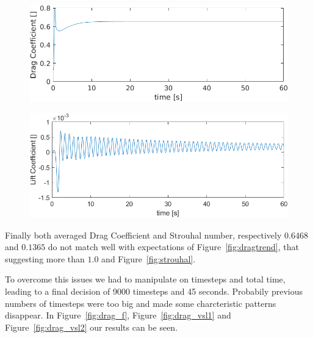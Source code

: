 \documentclass[12pt]{article}
\begin{document}
        \begin{figure}[!ht]
                \includegraphics[width=\textwidth]{Drag_Coefficient.png}
                \centering
                \caption{}
                \label{fig:drag_coeff}
        \end{figure}
                \begin{figure}[!ht]
                \includegraphics[width=\textwidth]{Lift_Coefficient.png}
                \centering
                \caption{}
                \label{fig:lift_coeff}
        \end{figure}


        Finally both averaged Drag Coefficient and Strouhal number, respectively  $\num{0.6468}$ and $0.1365$ do not match well with expectations of Figure~\ref{fig:dragtrend}, that suggesting more than $1.0$ and Figure~\ref{fig:strouhal}.
        
        To overcome this issues we had to manipulate on timesteps and total time, leading to a final decision of 9000 timesteps and 45 seconds. Probabily previous numbers of timesteps were too big and made some charcteristic patterns disappear. In Figure~\ref{fig:drag_f}, Figure~\ref{fig:drag_vsl1} and Figure~\ref{fig:drag_vsl2} our results can be seen. 
        
\end{document}

